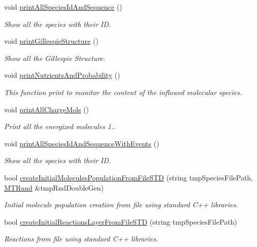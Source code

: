 \begin{DoxyCompactItemize}
void \hyperlink{a00003_a48d8fd9d8d5c9c31f0b4af87c8cbd28f}{print\-All\-Species\-Id\-And\-Sequence} ()
\begin{DoxyCompactList}\small\item\em Show all the species with their I\-D. \end{DoxyCompactList}\item 
void \hyperlink{a00003_aa3a18c59f6127c642603a98c1b3a2224}{print\-Gillespie\-Structure} ()
\begin{DoxyCompactList}\small\item\em Show all the Gillespie Structure. \end{DoxyCompactList}\item 
void \hyperlink{a00003_ad8fcefe5325382fb307627c7e8362ba8}{print\-Nutrients\-And\-Probability} ()
\begin{DoxyCompactList}\small\item\em This function print to monitor the content of the inflowed molecular species. \end{DoxyCompactList}\item 
void \hyperlink{a00003_af579052ed051a2e3516218220d238303}{print\-All\-Charge\-Mols} ()
\begin{DoxyCompactList}\small\item\em Print all the energized molecules  1.. \end{DoxyCompactList}\item 
void \hyperlink{a00003_a3beddfc55f70a9cc855c3e3caaa7f188}{print\-All\-Species\-Id\-And\-Sequence\-With\-Events} ()
\begin{DoxyCompactList}\small\item\em Show all the species with their I\-D. \end{DoxyCompactList}\item 
bool \hyperlink{a00003_af6db92c710f2588ba7dff1165e26d538}{create\-Initial\-Molecules\-Population\-From\-File\-S\-T\-D} (string tmp\-Species\-File\-Path, \hyperlink{a00008}{M\-T\-Rand} \&tmp\-Rnd\-Double\-Gen)
\begin{DoxyCompactList}\small\item\em Initial molecule population creation from file using standard C++ libraries. \end{DoxyCompactList}\item 
bool \hyperlink{a00003_a2f181e0d3ad1e8062ba0a8c9358ebc58}{create\-Initial\-Reactions\-Layer\-From\-File\-S\-T\-D} (string tmp\-Species\-File\-Path)
\begin{DoxyCompactList}\small\item\em Reactions from file using standard C++ libraries. \end{DoxyCompactList}\item 

\end{DoxyCompactItemize}
